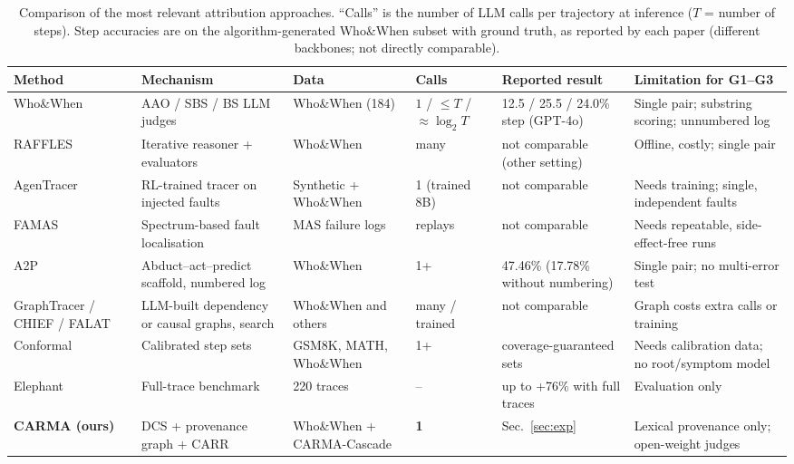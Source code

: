 \documentclass[conference]{IEEEtran}
\begin{document}
\begin{table}[t]
\centering
\caption{Comparison of the most relevant attribution approaches. ``Calls'' is the number of LLM calls per trajectory at inference ($T$ = number of steps). Step accuracies are on the algorithm-generated Who\&When subset with ground truth, as reported by each paper (different backbones; not directly comparable).}
\label{tab:related}
\footnotesize
\setlength{\tabcolsep}{3pt}
\begin{tabular}{@{}p{2.2cm}p{3.6cm}p{2.3cm}p{1.6cm}p{3.3cm}p{3.6cm}@{}}
\toprule
Method & Mechanism & Data & Calls & Reported result & Limitation for G1--G3 \\
\midrule
Who\&When~\cite{zhang2025whowhen} & AAO / SBS / BS LLM judges & Who\&When (184) & $1$ / $\le T$ / $\approx\log_2 T$ & 12.5 / 25.5 / 24.0\% step (GPT-4o) & Single pair; substring scoring; unnumbered log \\
RAFFLES~\cite{zhu2026raffles} & Iterative reasoner + evaluators & Who\&When & many & not comparable (other setting) & Offline, costly; single pair \\
AgenTracer~\cite{zhang2026agentracer} & RL-trained tracer on injected faults & Synthetic + Who\&When & 1 (trained 8B) & not comparable & Needs training; single, independent faults \\
FAMAS~\cite{ge2026spectrum} & Spectrum-based fault localisation & MAS failure logs & replays & not comparable & Needs repeatable, side-effect-free runs \\
A2P~\cite{west2025a2p} & Abduct--act--predict scaffold, numbered log & Who\&When & 1+ & 47.46\% (17.78\% without numbering) & Single pair; no multi-error test \\
GraphTracer / CHIEF / FALAT~\cite{zhang2025graphtracer,wang2026chief,rafi2026falat} & LLM-built dependency or causal graphs, search & Who\&When and others & many / trained & not comparable & Graph costs extra calls or training \\
Conformal~\cite{feng2026conformal} & Calibrated step sets & GSM8K, MATH, Who\&When & 1+ & coverage-guaranteed sets & Needs calibration data; no root/symptom model \\
Elephant~\cite{chen2026elephant} & Full-trace benchmark & 220 traces & -- & up to +76\% with full traces & Evaluation only \\
\textbf{CARMA (ours)} & DCS + provenance graph + CARR & Who\&When + CARMA-Cascade & \textbf{1} & Sec.~\ref{sec:exp} & Lexical provenance only; open-weight judges \\
\bottomrule
\end{tabular}
\end{table}
\end{document}

